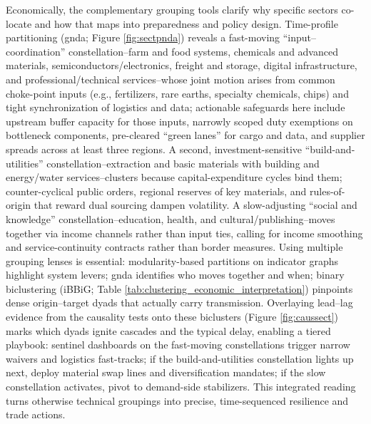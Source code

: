 \documentclass[preprint, 3p,
authoryear]{elsarticle} %
\begin{document}
Economically, the complementary grouping tools clarify why specific
sectors co-locate and how that maps into preparedness and policy design.
Time-profile partitioning (\gls{gnda}; Figure \ref{fig:sectpnda})
reveals a fast-moving ``input--coordination'' constellation--farm and
food systems, chemicals and advanced materials,
semiconductors/electronics, freight and storage, digital infrastructure,
and professional/technical services--whose joint motion arises from
common choke-point inputs (e.g., fertilizers, rare earths, specialty
chemicals, chips) and tight synchronization of logistics and data;
actionable safeguards here include upstream buffer capacity for those
inputs, narrowly scoped duty exemptions on bottleneck components,
pre-cleared ``green lanes'' for cargo and data, and supplier spreads
across at least three regions. A second, investment-sensitive
``build-and-utilities'' constellation--extraction and basic materials
with building and energy/water services--clusters because
capital-expenditure cycles bind them; counter-cyclical public orders,
regional reserves of key materials, and rules-of-origin that reward dual
sourcing dampen volatility. A slow-adjusting ``social and knowledge''
constellation--education, health, and cultural/publishing--moves
together via income channels rather than input ties, calling for income
smoothing and service-continuity contracts rather than border measures.
Using multiple grouping lenses is essential: modularity-based partitions
on indicator graphs highlight system levers; \gls{gnda} identifies who
moves together and when; binary biclustering (iBBiG; Table
\ref{tab:clustering_economic_interpretation}) pinpoints dense
origin--target dyads that actually carry transmission. Overlaying
lead--lag evidence from the causality tests onto these biclusters
(Figure \ref{fig:caussect}) marks which dyads ignite cascades and the
typical delay, enabling a tiered playbook: sentinel dashboards on the
fast-moving constellations trigger narrow waivers and logistics
fast-tracks; if the build-and-utilities constellation lights up next,
deploy material swap lines and diversification mandates; if the slow
constellation activates, pivot to demand-side stabilizers. This
integrated reading turns otherwise technical groupings into precise,
time-sequenced resilience and trade actions.
\end{document}
